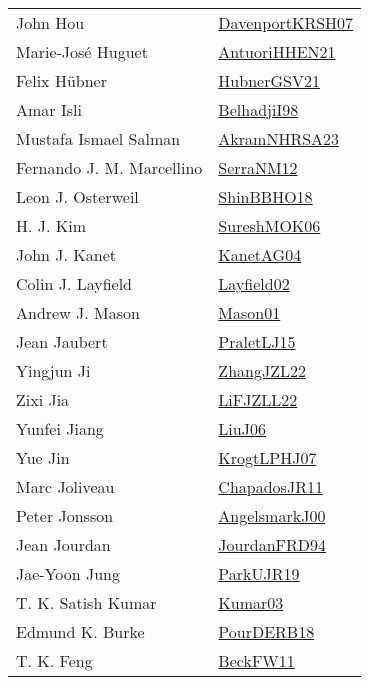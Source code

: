 {\begin{longtable}{p{4cm}p{20cm}}
John Hou & \href{papers/DavenportKRSH07.pdf}{DavenportKRSH07}\cite{DavenportKRSH07} \\
Marie{-}Jos{\'{e}} Huguet & \href{papers/AntuoriHHEN21.pdf}{AntuoriHHEN21}\cite{AntuoriHHEN21} \\
Felix H{\"{u}}bner & \href{articles/HubnerGSV21.pdf}{HubnerGSV21}\cite{HubnerGSV21} \\
Amar Isli & \href{articles/BelhadjiI98.pdf}{BelhadjiI98}\cite{BelhadjiI98} \\
Mustafa Ismael Salman & \href{articles/AkramNHRSA23.pdf}{AkramNHRSA23}\cite{AkramNHRSA23} \\
Fernando J. M. Marcellino & \href{papers/SerraNM12.pdf}{SerraNM12}\cite{SerraNM12} \\
Leon J. Osterweil & \href{articles/ShinBBHO18.pdf}{ShinBBHO18}\cite{ShinBBHO18} \\
H. J. Kim & \href{articles/SureshMOK06.pdf}{SureshMOK06}\cite{SureshMOK06} \\
John J. Kanet & \href{}{KanetAG04}\cite{KanetAG04} \\
Colin J. Layfield & \href{}{Layfield02}\cite{Layfield02} \\
Andrew J. Mason & \href{articles/Mason01.pdf}{Mason01}\cite{Mason01} \\
Jean Jaubert & \href{papers/PraletLJ15.pdf}{PraletLJ15}\cite{PraletLJ15} \\
Yingjun Ji & \href{papers/ZhangJZL22.pdf}{ZhangJZL22}\cite{ZhangJZL22} \\
Zixi Jia & \href{papers/LiFJZLL22.pdf}{LiFJZLL22}\cite{LiFJZLL22} \\
Yunfei Jiang & \href{papers/LiuJ06.pdf}{LiuJ06}\cite{LiuJ06} \\
Yue Jin & \href{papers/KrogtLPHJ07.pdf}{KrogtLPHJ07}\cite{KrogtLPHJ07} \\
Marc Joliveau & \href{papers/ChapadosJR11.pdf}{ChapadosJR11}\cite{ChapadosJR11} \\
Peter Jonsson & \href{papers/AngelsmarkJ00.pdf}{AngelsmarkJ00}\cite{AngelsmarkJ00} \\
Jean Jourdan & \href{papers/JourdanFRD94.pdf}{JourdanFRD94}\cite{JourdanFRD94} \\
Jae{-}Yoon Jung & \href{papers/ParkUJR19.pdf}{ParkUJR19}\cite{ParkUJR19} \\
T. K. Satish Kumar & \href{papers/Kumar03.pdf}{Kumar03}\cite{Kumar03} \\
Edmund K. Burke & \href{articles/PourDERB18.pdf}{PourDERB18}\cite{PourDERB18} \\
T. K. Feng & \href{articles/BeckFW11.pdf}{BeckFW11}\cite{BeckFW11} \\

\end{longtable}}
